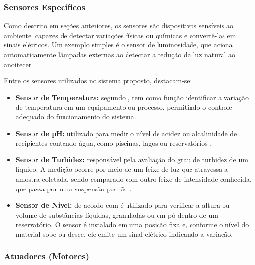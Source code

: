         \subsubsection*{Sensores Específicos}
            Como descrito em seções anteriores, os sensores são dispositivos sensíveis ao ambiente, capazes de detectar variações físicas ou químicas e convertê-las em sinais elétricos. Um exemplo simples é o sensor de luminosidade, que aciona automaticamente lâmpadas externas ao detectar a redução da luz natural ao anoitecer. 
            
            Entre os sensores utilizados no sistema proposto, destacam-se:

            \begin{itemize}

                \item \textbf{Sensor de Temperatura:} 
                    segundo \cite{leite2020plataforma}, tem como função identificar a variação de temperatura em um equipamento ou processo, permitindo o controle adequado do funcionamento do sistema.

                \item \textbf{Sensor de pH:} 
                    utilizado para medir o nível de acidez ou alcalinidade de recipientes contendo água, como piscinas, lagos ou reservatórios \cite{leite2020plataforma}.
                
                \item \textbf{Sensor de Turbidez:}
                    responsável pela avaliação do grau de turbidez de um líquido. A medição ocorre por meio de um feixe de luz que atravessa a amostra coletada, sendo comparado com outro feixe de intensidade conhecida, que passa por uma suspensão padrão \cite{cardoso2011sensor}.
                
                \item \textbf{Sensor de Nível:}
                    de acordo com \cite{souza2018sensor} é utilizado para verificar a altura ou volume de substâncias líquidas, granuladas ou em pó dentro de um reservatório. O sensor é instalado em uma posição fixa e, conforme o nível do material sobe ou desce, ele emite um sinal elétrico indicando a variação. 
                
            \end{itemize}

        \subsubsection*{Atuadores (Motores)} 
    

